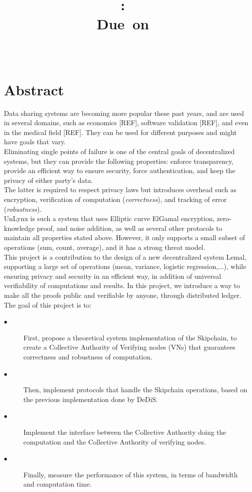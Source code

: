\documentclass{article}
\title{
\logoepfl
\vspace{2in}
\textmd{\textbf{\hmwkClass:\ \hmwkTitle}}\\
\normalsize\vspace{0.1in}\small{Due\ on\ \hmwkDueDate}\\
\vspace{0.1in}\large{\textit{\hmwkClassInstructor\ \hmwkClassTime}}
\author{\textbf{\hmwkAuthorName}}
\vspace{3in}
}
\begin{document}
\maketitle

\newpage
\section*{Abstract}
Data sharing systems are becoming more popular these past years, and are used in several domains, such as economics [REF], software validation [REF], and even in the medical field [REF]. They can be used for different purposes and might have goals that vary.\\
Eliminating single points of failure is one of the central goals of decentralized systems,  but they can provide the following properties: enforce transparency, provide an efficient way to ensure security, force authentication, and keep the privacy of either party's data.\\
The latter is required to respect privacy laws but introduces overhead such as encryption, verification of computation (\textit{correctness}), and tracking of error (\textit{robustness}).\\
UnLynx is such a system that uses Elliptic curve ElGamal encryption, zero-knowledge proof, and noise addition, as well as several other protocols to maintain all properties stated above. However, it only supports a small subset of operations (sum, count, average), and it has a strong threat model.\\
This project is a contribution to the design of a new decentralized system Lemal, supporting a large set of operations (mean, variance, logistic regression,...), while ensuring privacy and security in an efficient way, in addition of universal verifiability of computations and results.
In this project, we introduce a way to make all the proofs public and verifiable by anyone, through distributed ledger.
The goal of this project is to:
\begin{description}
\item[$\bullet$] First, propose a theoretical system implementation of the Skipchain, to create a Collective Authority of Verifying nodes (VNs) that guarantees correctness and robustness of computation.
\item[$\bullet$] Then, implement protocols that handle the Skipchain operations, based on the previous implementation done by DeDiS.
\item[$\bullet$] Implement the interface between the Collective Authority doing the computation and the Collective Authority of verifying nodes.
\item[$\bullet$] Finally, measure the performance of this system, in terms of bandwidth and computation time.
\end{description}
\end{document}
